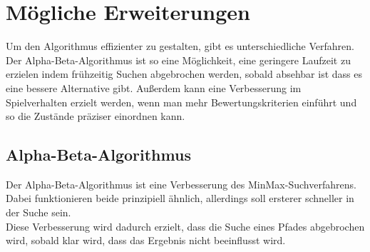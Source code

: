
\chapter{Mögliche Erweiterungen}
\label{ch:Erweiterungen}
Um den Algorithmus effizienter zu gestalten, gibt es unterschiedliche Verfahren. Der Alpha-Beta-Algorithmus ist so eine Möglichkeit, eine geringere Laufzeit zu erzielen indem frühzeitig Suchen abgebrochen werden, sobald absehbar ist dass es eine bessere Alternative gibt. Außerdem kann eine Verbesserung im Spielverhalten erzielt werden, wenn man mehr Bewertungskriterien einführt und so die Zustände präziser einordnen kann.
\section{Alpha-Beta-Algorithmus}
\label{ch:Entwurf:sec:1.AB-Algo}
Der Alpha-Beta-Algorithmus ist eine Verbesserung des MinMax-Suchverfahrens. Dabei funktionieren beide prinzipiell ähnlich, allerdings soll ersterer schneller in der Suche sein.\\
Diese Verbesserung wird dadurch erzielt, dass die Suche eines Pfades abgebrochen wird, sobald klar wird, dass das Ergebnis nicht beeinflusst wird.



